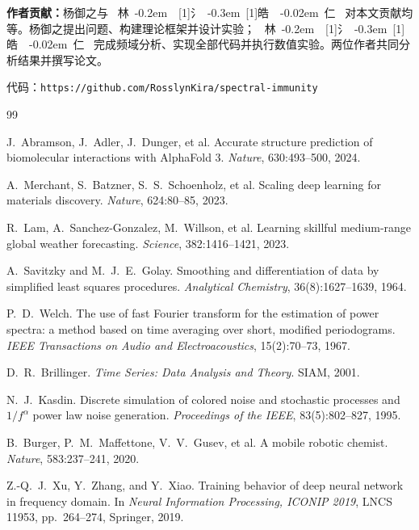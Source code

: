\documentclass[9pt,twocolumn]{article}
\theoremstyle{remark}
\theoremstyle{definition}
\renewcommand{\baselinestretch}{0.78}
\newcommand{\澔}{%
  \hbox{%
    \scalebox{0.75}[1]{氵}%
    \kern -0.3em%
    \scalebox{0.8}[1]{皓}%
  }%
}
\newcommand{\name}{%
  \mbox{%
    林%
    \kern -0.2em%
    \澔%
    \kern -0.02em%
    仁%
  }%
}
\begin{document}
\vspace{1pt}
{\scriptsize\noindent\textbf{作者贡献：}杨御之与\name 对本文贡献均等。杨御之提出问题、构建理论框架并设计实验；\name 完成频域分析、实现全部代码并执行数值实验。两位作者共同分析结果并撰写论文。}

\vspace{1pt}
{\scriptsize\noindent 代码：\texttt{https://github.com/RosslynKira/spectral-immunity}}

\begingroup
\scriptsize
\setlength{\itemsep}{0.5pt}
\setlength{\parsep}{0pt}
\renewcommand{\baselinestretch}{0.72}
\begin{thebibliography}{99}

J.~Abramson, J.~Adler, J.~Dunger, et al.
\newblock Accurate structure prediction of biomolecular interactions with AlphaFold 3.
\newblock \textit{Nature}, 630:493--500, 2024.

A.~Merchant, S.~Batzner, S.~S.~Schoenholz, et al.
\newblock Scaling deep learning for materials discovery.
\newblock \textit{Nature}, 624:80--85, 2023.

R.~Lam, A.~Sanchez-Gonzalez, M.~Willson, et al.
\newblock Learning skillful medium-range global weather forecasting.
\newblock \textit{Science}, 382:1416--1421, 2023.

A.~Savitzky and M.~J.~E.~Golay.
\newblock Smoothing and differentiation of data by simplified least squares procedures.
\newblock \textit{Analytical Chemistry}, 36(8):1627--1639, 1964.

P.~D.~Welch.
\newblock The use of fast Fourier transform for the estimation of power spectra: a method based on time averaging over short, modified periodograms.
\newblock \textit{IEEE Transactions on Audio and Electroacoustics}, 15(2):70--73, 1967.

D.~R.~Brillinger.
\newblock \textit{Time Series: Data Analysis and Theory}. SIAM, 2001.

N.~J.~Kasdin.
\newblock Discrete simulation of colored noise and stochastic processes and $1/f^\alpha$ power law noise generation.
\newblock \textit{Proceedings of the IEEE}, 83(5):802--827, 1995.

B.~Burger, P.~M.~Maffettone, V.~V.~Gusev, et al.
\newblock A mobile robotic chemist.
\newblock \textit{Nature}, 583:237--241, 2020.

Z.-Q.~J.~Xu, Y.~Zhang, and Y.~Xiao.
\newblock Training behavior of deep neural network in frequency domain.
\newblock In \textit{Neural Information Processing, ICONIP 2019}, LNCS 11953, pp.~264--274, Springer, 2019.


\end{thebibliography}
\end{document}
